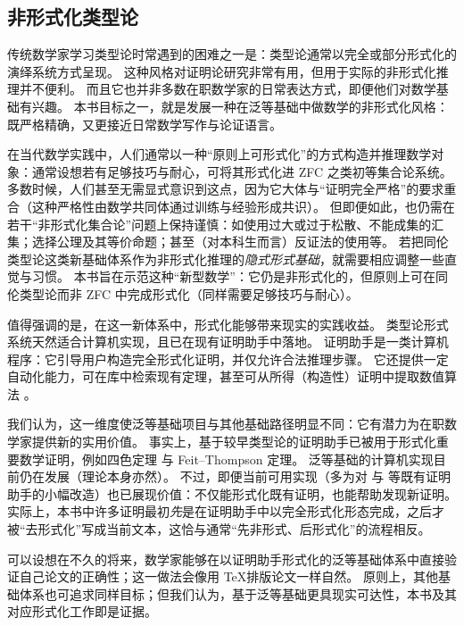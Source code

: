 %


\subsection*{非形式化类型论}

%
%
%
%
传统数学家学习类型论时常遇到的困难之一是：类型论通常以完全或部分形式化的演绎系统方式呈现。
这种风格对证明论研究非常有用，但用于实际的非形式化推理并不便利。
而且它也并非多数在职数学家的日常表达方式，即便他们对数学基础有兴趣。
本书目标之一，就是发展一种在泛等基础中做数学的非形式化风格：既严格精确，又更接近日常数学写作与论证语言。

在当代数学实践中，人们通常以一种“原则上可形式化”的方式构造并推理数学对象：通常设想若有足够技巧与耐心，可将其形式化进 ZFC 之类初等集合论系统。
多数时候，人们甚至无需显式意识到这点，因为它大体与“证明完全严格”的要求重合（这种严格性由数学共同体通过训练与经验形成共识）。
但即便如此，也仍需在若干“非形式化集合论”问题上保持谨慎：如使用过大或过于松散、不能成集的汇集；选择公理及其等价命题；甚至（对本科生而言）反证法的使用等。
若把同伦类型论这类新基础体系作为非形式化推理的\emph{隐式形式基础}，就需要相应调整一些直觉与习惯。
本书旨在示范这种“新型数学”：它仍是非形式化的，但原则上可在同伦类型论而非 ZFC 中完成形式化（同样需要足够技巧与耐心）。

值得强调的是，在这一新体系中，形式化能够带来现实的实践收益。
类型论形式系统天然适合计算机实现，且已在现有证明助手中落地。
%
证明助手是一类计算机程序：它引导用户构造完全形式化证明，并仅允许合法推理步骤。
它还提供一定自动化能力，可在库中检索现有定理，甚至可从所得（构造性）证明中提取数值算法 。

我们认为，这一维度使泛等基础项目与其他基础路径明显不同：它有潜力为在职数学家提供新的实用价值。
事实上，基于较早类型论的证明助手已被用于形式化重要数学证明，例如四色定理  与 Feit--Thompson 定理。
泛等基础的计算机实现目前仍在发展（理论本身亦然）。
%
不过，即便当前可用实现（多为对 \Coq 与
\Agda 等既有证明助手的小幅改造）也已展现价值：不仅能形式化既有证明，也能帮助发现新证明。
实际上，本书中许多证明最初\emph{先}是在证明助手中以完全形式化形态完成，之后才被“去形式化”写成当前文本，这恰与通常“先非形式、后形式化”的流程相反。

可以设想在不久的将来，数学家能够在以证明助手形式化的泛等基础体系中直接验证自己论文的正确性；这一做法会像用 \TeX 排版论文一样自然。
原则上，其他基础体系也可追求同样目标；但我们认为，基于泛等基础更具现实可达性，本书及其对应形式化工作即是证据。

